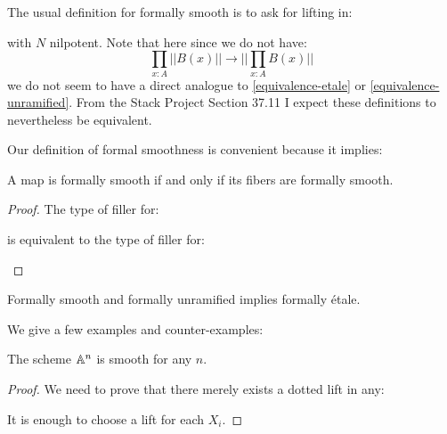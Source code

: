 \begin{remark}
The usual definition for formally smooth is to ask for lifting in:
 \begin{center}
    \end{center}
    with $N$ nilpotent. Note that here since we do not have: 
\[
\prod_{x:A} ||B(x)|| \to ||\prod_{x:A}B(x)||
\]
we do not seem to have a direct analogue to \cref{equivalence-etale} or \cref{equivalence-unramified}. From the Stack Project Section 37.11 I expect these definitions to nevertheless be  equivalent.
\end{remark}

Our definition of formal smoothness is convenient because it implies:

\begin{lemma}
A map is formally smooth if and only if its fibers are formally smooth.
\end{lemma}
\begin{proof}
The type of filler for:
 \begin{center}
    \end{center}
   is equivalent to the type of filler for:
    \begin{center}
    \end{center}
\end{proof}

\begin{remark}
Formally smooth and formally unramified implies formally étale.
\end{remark}

We give a few examples and counter-examples:

\begin{lemma}
The scheme $\mathbb{A}^n$ is smooth for any $n$.
\end{lemma}

\begin{proof}
We need to prove that there merely exists a dotted lift in any:
 \begin{center}
    \end{center}
    It is enough to choose a lift for each $X_i$.
\end{proof}

